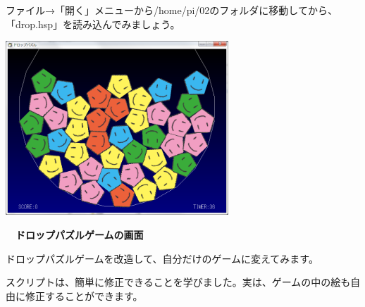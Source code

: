 \documentclass[a4paper,dvipdfmx]{jarticle}
\newcommand\textstyleqwerty[1]{#1}
\begin{document}
\bigskip



\bigskip

\textstyleqwerty{ファイル→「開く」メニューから/home/pi/02のフォルダに移動してから、「drop.hsp」を読み込んでみましょう。}



\begin{center}
\includegraphics[width=8.356cm,height=6.544cm]{text02-img/text02-img015.png}

\end{center}

\bigskip


\bigskip


\bigskip


\bigskip


\bigskip


\bigskip


\bigskip


\bigskip


\bigskip


\bigskip


\bigskip


\bigskip

\textstyleqwerty{\textbf{　ドロップパズルゲームの画面}}


\bigskip


\bigskip


\bigskip


\bigskip

ドロップパズルゲームを改造して、自分だけのゲームに変えてみます。

スクリプトは、簡単に修正できることを学びました。実は、ゲームの中の絵も自由に修正することができます。


\bigskip


\bigskip
\end{document}
